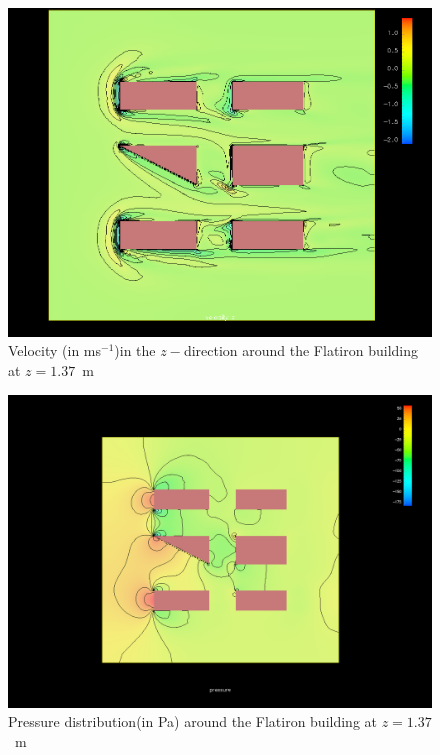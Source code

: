 \begin{figure}[htp]
\centering
\includegraphics[width = \textwidth]{zvelocity.png}
\caption{Velocity (in ms$^{-1}$)in the $z-$direction around the Flatiron building at $z=1.37$~m}
\label{fig:zvelocity}
\end{figure}
\begin{figure}[htp]
\centering
\includegraphics[width = \textwidth]{zpressure.png}
\caption{Pressure distribution(in Pa) around the Flatiron building at $z=1.37$~m}
\label{fig:zpressure}
\end{figure}
